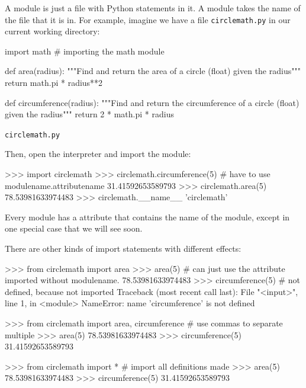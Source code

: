 \documentclass[11pt]{cselabheader}
\begin{document}
{A module is just a file with Python statements in it. A module takes the name of
the file that it is in. For example, imagine we have a file
\texttt{circlemath.py} in our current working directory:

\begin{listing}[H]
\vspace{-0.5em}
\begin{python3code}
import math # importing the math module

def area(radius):
    """Find and return the area of a circle (float) given the radius"""
    return math.pi * radius**2

def circumference(radius):
    """Find and return the circumference of a circle (float) given the radius"""
    return 2 * math.pi * radius
\end{python3code}
\vspace{-1em}
\caption{\texttt{circlemath.py}}
\vspace{-0.5em}
\end{listing}

Then, open the interpreter and import the module:

\begin{pyconcode}
>>> import circlemath
>>> circlemath.circumference(5) # have to use modulename.attributename
31.41592653589793
>>> circlemath.area(5)
78.53981633974483
>>> circlemath.__name__
'circlemath'
\end{pyconcode}

Every module has a  attribute that contains the name of
the module, except in one special case that we will see soon.

There are other kinds of import statements with different effects:

\begin{pyconcode}
>>> from circlemath import area
>>> area(5) # can just use the attribute imported without modulename.
78.53981633974483
>>> circumference(5) # not defined, because not imported
Traceback (most recent call last):
  File "<input>", line 1, in <module>
NameError: name 'circumference' is not defined
\end{pyconcode}

\begin{pyconcode}
>>> from circlemath import area, circumference # use commas to separate multiple
>>> area(5)
78.53981633974483
>>> circumference(5)
31.41592653589793
\end{pyconcode}

\begin{pyconcode}
>>> from circlemath import * # import all definitions made
>>> area(5)
78.53981633974483
>>> circumference(5)
31.41592653589793
\end{pyconcode}

}
\end{document}
